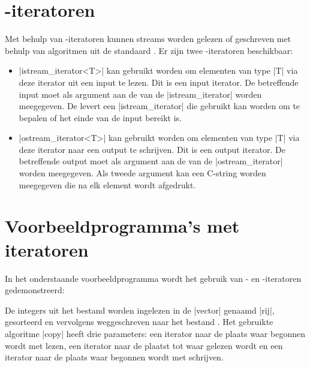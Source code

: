 \begin{cpplstShortInline}
\section{\hyp{}iteratoren}
\label{sec:stmitr}
Met behulp van \hyp{}iteratoren kunnen \Cpp{} streams worden gelezen of geschreven met behulp van algoritmen uit de \Cpp{} standaard .
Er zijn twee \hyp{}iteratoren beschikbaar:
\begin{itemize}
	\item |istream_iterator<T>| kan gebruikt worden om elementen van type |T| via deze iterator uit een input  te lezen.
	Dit is een input iterator.
	De betreffende input  moet als argument aan de  van de |istream_iterator| worden meegegeven.
	De  levert een |istream_iterator| die gebruikt kan worden om te bepalen of het einde van de input  bereikt is.
	\item |ostream_iterator<T>| kan gebruikt worden om elementen van type |T| via deze iterator naar een output  te schrijven.
	Dit is een output iterator.
	De betreffende output  moet als argument aan de  van de |ostream_iterator| worden meegegeven.
	Als tweede argument kan een C-string worden meegegeven die na elk element wordt afgedrukt.
\end{itemize}

\section{Voorbeeldprogramma's met iteratoren}
\label{sec:vbiteratoren}
In het onderstaande voorbeeldprogramma  wordt het gebruik van \hyp{} en \hyp{}iteratoren gedemonstreerd:  


De integers uit het bestand  worden ingelezen in de |vector| genaamd |rij|, gesorteerd en vervolgens weggeschreven naar het bestand .
Het gebruikte algoritme |copy| heeft drie parameters: een iterator naar de plaats waar begonnen wordt met lezen, een iterator naar de plaatst tot waar gelezen wordt en een iterator naar de plaats waar begonnen wordt met schrijven.


\end{cpplstShortInline}
